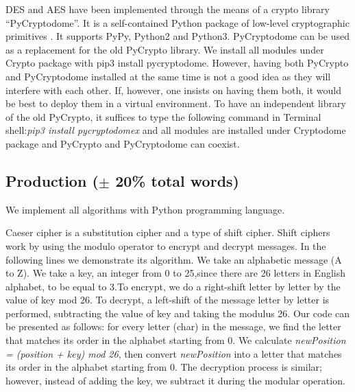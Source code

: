 DES and AES have been implemented through the means of a crypto library “PyCryptodome”. It is a self-contained Python package of low-level cryptographic primitives \cite{pycryptodome}. It supports PyPy, Python2 and Python3. PyCryptodome can be used as a replacement for the old PyCrypto library. We install all modules under Crypto package with pip3 install pycryptodome.  However, having both PyCrypto and PyCryptodome installed at the same time is not a good idea as they will interfere with each other. If, however, one insists on having them both, it would be best to deploy them in a virtual environment. To have an independent library of the old PyCrypto, it suffices to type the following command in Terminal shell:\textit{pip3 install pycryptodomex} and all modules are installed under Cryptodome package and PyCrypto and PyCryptodome can coexist. 


\subsection{Production ($\pm$ 20\% total words)}

We implement all algorithms with Python programming language. 

Caeser cipher is a substitution cipher and a type of shift cipher. Shift ciphers work by using the modulo operator to encrypt and decrypt messages. In the following lines we demonstrate its algorithm. We take an alphabetic message (A to Z). We take a key, an integer from 0 to 25,since there are 26 letters in English alphabet, to be equal to 3.To encrypt, we do a right-shift letter by letter by the value of key mod 26. To decrypt, a left-shift of the message letter by letter is performed, subtracting the value of key and taking the modulus 26. Our code can be presented as follows: for every letter (char) in the message, we find the letter that matches its order in the alphabet starting from 0. We calculate \textit{newPosition = (position + key) mod 26}, then convert \textit{newPosition} into a letter that matches its order in the alphabet starting from 0. The decryption process is similar; however, instead of adding the key, we subtract it during the modular operation.

